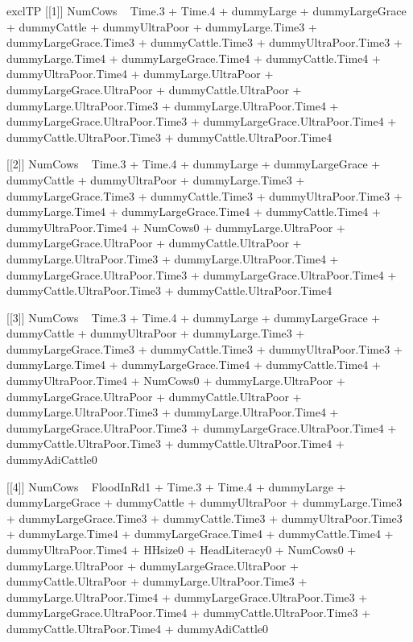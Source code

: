 \begin{Schunk}
\begin{Soutput}
[1] exclTP
[[1]]
NumCows ~ Time.3 + Time.4 + dummyLarge + dummyLargeGrace + dummyCattle + 
    dummyUltraPoor + dummyLarge.Time3 + dummyLargeGrace.Time3 + 
    dummyCattle.Time3 + dummyUltraPoor.Time3 + dummyLarge.Time4 + 
    dummyLargeGrace.Time4 + dummyCattle.Time4 + dummyUltraPoor.Time4 + 
    dummyLarge.UltraPoor + dummyLargeGrace.UltraPoor + dummyCattle.UltraPoor + 
    dummyLarge.UltraPoor.Time3 + dummyLarge.UltraPoor.Time4 + 
    dummyLargeGrace.UltraPoor.Time3 + dummyLargeGrace.UltraPoor.Time4 + 
    dummyCattle.UltraPoor.Time3 + dummyCattle.UltraPoor.Time4

[[2]]
NumCows ~ Time.3 + Time.4 + dummyLarge + dummyLargeGrace + dummyCattle + 
    dummyUltraPoor + dummyLarge.Time3 + dummyLargeGrace.Time3 + 
    dummyCattle.Time3 + dummyUltraPoor.Time3 + dummyLarge.Time4 + 
    dummyLargeGrace.Time4 + dummyCattle.Time4 + dummyUltraPoor.Time4 + 
    NumCows0 + dummyLarge.UltraPoor + dummyLargeGrace.UltraPoor + 
    dummyCattle.UltraPoor + dummyLarge.UltraPoor.Time3 + dummyLarge.UltraPoor.Time4 + 
    dummyLargeGrace.UltraPoor.Time3 + dummyLargeGrace.UltraPoor.Time4 + 
    dummyCattle.UltraPoor.Time3 + dummyCattle.UltraPoor.Time4

[[3]]
NumCows ~ Time.3 + Time.4 + dummyLarge + dummyLargeGrace + dummyCattle + 
    dummyUltraPoor + dummyLarge.Time3 + dummyLargeGrace.Time3 + 
    dummyCattle.Time3 + dummyUltraPoor.Time3 + dummyLarge.Time4 + 
    dummyLargeGrace.Time4 + dummyCattle.Time4 + dummyUltraPoor.Time4 + 
    NumCows0 + dummyLarge.UltraPoor + dummyLargeGrace.UltraPoor + 
    dummyCattle.UltraPoor + dummyLarge.UltraPoor.Time3 + dummyLarge.UltraPoor.Time4 + 
    dummyLargeGrace.UltraPoor.Time3 + dummyLargeGrace.UltraPoor.Time4 + 
    dummyCattle.UltraPoor.Time3 + dummyCattle.UltraPoor.Time4 + 
    dummyAdiCattle0

[[4]]
NumCows ~ FloodInRd1 + Time.3 + Time.4 + dummyLarge + dummyLargeGrace + 
    dummyCattle + dummyUltraPoor + dummyLarge.Time3 + dummyLargeGrace.Time3 + 
    dummyCattle.Time3 + dummyUltraPoor.Time3 + dummyLarge.Time4 + 
    dummyLargeGrace.Time4 + dummyCattle.Time4 + dummyUltraPoor.Time4 + 
    HHsize0 + HeadLiteracy0 + NumCows0 + dummyLarge.UltraPoor + 
    dummyLargeGrace.UltraPoor + dummyCattle.UltraPoor + dummyLarge.UltraPoor.Time3 + 
    dummyLarge.UltraPoor.Time4 + dummyLargeGrace.UltraPoor.Time3 + 
    dummyLargeGrace.UltraPoor.Time4 + dummyCattle.UltraPoor.Time3 + 
    dummyCattle.UltraPoor.Time4 + dummyAdiCattle0


\end{Soutput}
\end{Schunk}
